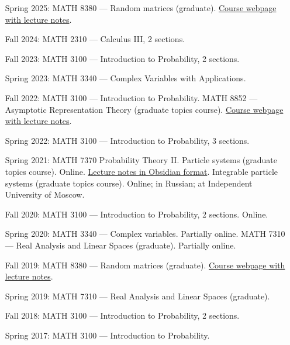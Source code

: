 \documentclass[letterpaper,11pt]{article}
\begin{document}
\begin{itemize}
\item[Spring 2025:]
    MATH 8380 --- Random matrices (graduate).
    \href{https://lpetrov.cc/rmt25/}{Course webpage with lecture notes}.

\item[Fall 2024:]
    MATH 2310 --- Calculus III, 2 sections.

\item[Fall 2023:]
	MATH 3100 --- Introduction to Probability, 2 sections.

\item[Spring 2023:]
	MATH 3340 --- Complex Variables with Applications.

\item[Fall 2022:]
	MATH 3100 --- Introduction to Probability.
	MATH 8852 --- Asymptotic Representation Theory (graduate topics course). \href{https://lpetrov.cc/art2022/}{Course webpage with lecture notes}.

\item[Spring 2022:]
	MATH 3100 --- Introduction to Probability, 3 sections.

\item[Spring 2021:]
	MATH 7370 Probability Theory II. Particle systems (graduate topics course). Online. \href{https://github.com/lenis2000/HTML_ParticleSysS21}{Lecture notes in Obsidian format}.
	Integrable particle systems (graduate topics course). Online; in Russian; at Independent University of Moscow.

\item[Fall 2020:]
	MATH 3100 --- Introduction to Probability, 2 sections. Online.

\item[Spring 2020:]
	MATH 3340 --- Complex variables. Partially online.
	MATH 7310 --- Real Analysis and Linear Spaces (graduate). Partially online.

\item[Fall 2019:]
	MATH 8380 --- Random matrices (graduate). \href{https://lpetrov.cc/rmt19/}{Course webpage with lecture notes}.

\item[Spring 2019:]
	MATH 7310 --- Real Analysis and Linear Spaces (graduate).

\item[Fall 2018:]
	MATH 3100 --- Introduction to Probability, 2 sections.

\item[Spring 2017:]
	MATH 3100 --- Introduction to Probability.


\end{itemize}
\end{document}

